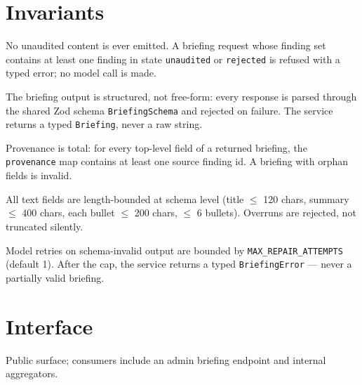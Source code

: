 \section{Invariants}
\begin{invariant}
No unaudited content is ever emitted. A briefing request whose finding set contains at least one
finding in state \texttt{unaudited} or \texttt{rejected} is refused with a typed error; no model
call is made.
\end{invariant}

\begin{invariant}
The briefing output is structured, not free-form: every response is parsed through the shared
Zod schema \texttt{BriefingSchema} and rejected on failure. The service returns a typed
\texttt{Briefing}, never a raw string.
\end{invariant}

\begin{invariant}
Provenance is total: for every top-level field of a returned briefing, the \texttt{provenance}
map contains at least one source finding id. A briefing with orphan fields is invalid.
\end{invariant}

\begin{invariant}
All text fields are length-bounded at schema level (title $\le$ 120 chars, summary $\le$ 400
chars, each bullet $\le$ 200 chars, $\le$ 6 bullets). Overruns are rejected, not truncated
silently.
\end{invariant}

\begin{invariant}
Model retries on schema-invalid output are bounded by \texttt{MAX\_REPAIR\_ATTEMPTS} (default
1). After the cap, the service returns a typed \texttt{BriefingError} --- never a partially
valid briefing.
\end{invariant}

\section{Interface}
Public surface; consumers include an admin briefing endpoint and internal aggregators.

